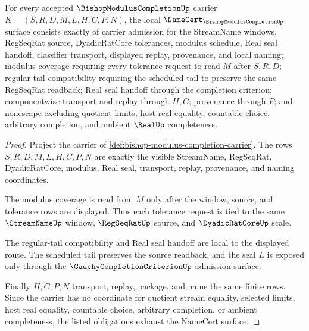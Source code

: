 \begin{theorem}
\label{thm:bishop-modulus-completion-namecert-obligations}
For every accepted $\BishopModulusCompletionUp$ carrier $K=(S,R,D,M,L,H,C,P,N)$, the local $\NameCert_{\BishopModulusCompletionUp}$ surface consists exactly of carrier admission for the StreamName windows, RegSeqRat source, DyadicRatCore tolerances, modulus schedule, Real seal handoff, classifier transport, displayed replay, provenance, and local naming; modulus coverage requiring every tolerance request to read $M$ after $S,R,D$; regular-tail compatibility requiring the scheduled tail to preserve the same RegSeqRat readback; Real seal handoff through the completion criterion; componentwise transport and replay through $H,C$; provenance through $P$; and nonescape excluding quotient limits, host real equality, countable choice, arbitrary completion, and ambient $\RealUp$ completeness.
\end{theorem}
\begin{proof}
Project the carrier of \autoref{def:bishop-modulus-completion-carrier}. The rows $S,R,D,M,L,H,C,P,N$ are exactly the visible StreamName, RegSeqRat, DyadicRatCore, modulus, Real seal, transport, replay, provenance, and naming coordinates.

The modulus coverage is read from $M$ only after the window, source, and tolerance rows are displayed. Thus each tolerance request is tied to the same $\StreamNameUp$ window, $\RegSeqRatUp$ source, and $\DyadicRatCoreUp$ scale.

The regular-tail compatibility and Real seal handoff are local to the displayed route. The scheduled tail preserves the source readback, and the seal $L$ is exposed only through the $\CauchyCompletionCriterionUp$ admission surface.

Finally $H,C,P,N$ transport, replay, package, and name the same finite rows. Since the carrier has no coordinate for quotient stream equality, selected limits, host real equality, countable choice, arbitrary completion, or ambient completeness, the listed obligations exhaust the NameCert surface.
\end{proof}

